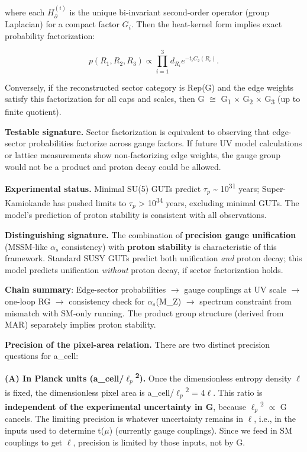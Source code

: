\documentclass[11pt,a4paper]{article}
\theoremstyle{remark}
\begin{document}
where each \(H^{(i)}_{\partial}\) is the unique bi-invariant second-order operator
(group Laplacian) for a compact factor \(G_i\). Then the heat-kernel form implies
exact probability factorization:

\[
p(R_1, R_2, R_3) \propto \prod_{i=1}^3 d_{R_i} e^{-t_i C_2(R_i)}.
\]

Conversely, if the reconstructed sector category is Rep(G) and the edge weights
satisfy this factorization for all caps and scales, then G \ensuremath{\cong} G\textsubscript{1} \ensuremath{\times} G\textsubscript{2} \ensuremath{\times} G\textsubscript{3}
(up to finite quotient).

\textbf{Testable signature.} Sector factorization is equivalent to observing that
edge-sector probabilities factorize across gauge factors. If future UV model
calculations or lattice measurements show non-factorizing edge weights, the
gauge group would not be a product and proton decay could be allowed.

\textbf{Experimental status.} Minimal SU(5) GUTs predict $\tau_p$ \textasciitilde{} 10\textsuperscript{31}
years; Super-Kamiokande has pushed limits to $\tau_p$ \textgreater{} 10\textsuperscript{34} years,
excluding minimal GUTs. The model's prediction of proton stability is
consistent with all observations.

\textbf{Distinguishing signature.} The combination of \textbf{precision gauge
unification} (MSSM-like $\alpha_s$ consistency) with \textbf{proton stability}
is characteristic of this framework. Standard SUSY GUTs predict both
unification \emph{and} proton decay; this model predicts unification \emph{without}
proton decay, if sector factorization holds.

\textbf{Chain summary}: Edge-sector probabilities \ensuremath{\to} gauge couplings at UV scale
\ensuremath{\to} one-loop RG \ensuremath{\to} consistency check for $\alpha_s$(M\_Z) \ensuremath{\to} spectrum
constraint from mismatch with SM-only running. The product group structure
(derived from MAR) separately implies proton stability.

\textbf{Precision of the pixel-area relation.} There are two distinct precision questions for a\_cell:

\textbf{(A) In Planck units (a\_cell/$\ell_p$\textsuperscript{2}).} Once the dimensionless entropy density \ensuremath{\ell} is fixed, the dimensionless pixel area is a\_cell/$\ell_p$\textsuperscript{2} = 4\ensuremath{\ell}. This ratio is \textbf{independent of the experimental uncertainty in G}, because $\ell_p$\textsuperscript{2} \ensuremath{\propto} G cancels. The limiting precision is whatever uncertainty remains in \ensuremath{\ell}, i.e., in the inputs used to determine t(\ensuremath{\mu}) (currently gauge couplings). Since we feed in SM couplings to get \ensuremath{\ell}, precision is limited by those inputs, not by G.
\end{document}
